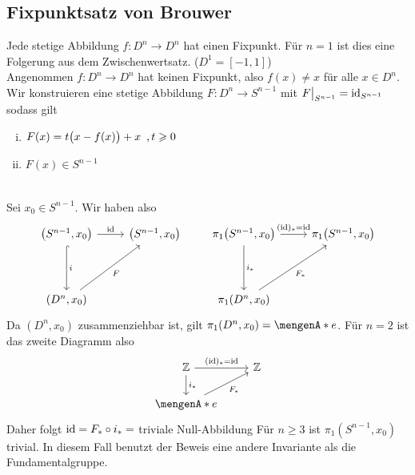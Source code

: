 \subsection{Fixpunktsatz von Brouwer} %
\label{sub:11.8}
Jede stetige Abbildung $f : D^n \to D^n$ hat einen Fixpunkt.
Für $n=1$ ist dies eine Folgerung aus dem Zwischenwertsatz. ($D^1= [-1,1]$)\smallskip \\
Angenommen $f : D^n \to D^n$ hat keinen Fixpunkt, also $f(x) \not= x$ für alle $x \in D^n$. Wir konstruieren eine stetige Abbildung $F : D^n \to S^{n-1}$ mit 
$F\big|_{S^{n-1}} = \id_{S^{n-1}}$ sodass gilt \\
\begin{minipage}{0.45\textwidth}
	\begin{enumerate}[(i)]
		\item $F(x) = t \enbrace[\big]{x- f(x)} + x \enspace, t\ge 0$
		\item $F(x) \in S^{n-1}$
	\end{enumerate}
\end{minipage} \quad 
\begin{minipage}{0.5\textwidth}
	\captionsetup{type=figure, skip=4pt, name=Abb.}
\end{minipage} \\
Sei $x_0 \in S^{n-1}$. Wir haben also
\[
	\begin{tikzcd}[row sep=4em]
		\enbrace*{S^{n-1}, x_0} \rar{\id} \dar[hook]{i} & \enbrace*{S^{n-1}, x_0} \\
		\enbrace*{D^n, x_0} \urar[swap]{F}
	\end{tikzcd}
	\qquad \begin{tikzcd}[row sep=4em]
		\pi_1 \enbrace*{S^{n-1}, x_0} \rar{(\id)_* = \id}  \dar{i_*}& \pi_1 \enbrace*{S^{n-1}, x_0} \\
		\pi_1 \enbrace*{D^n, x_0} \urar[swap]{F_*}   
	\end{tikzcd}
\]
Da $(D^n, x_0)$ zusammenziehbar ist, gilt $\pi_1 \enbrace*{D^n, x_0} = \set{e}$.
Für $n=2$ ist das zweite Diagramm also
\[
	\begin{tikzcd}
			\mathds{Z} \rar{(\id)_* = \id}  \dar{i_*}& \mathds{Z} \\
			\set{e} \urar[swap]{F_*} 
		\end{tikzcd}
\]
Daher folgt $\id = F_* \circ  i_* =$ triviale Null-Abbildung \light \bewende
{}
Für $n \ge 3$ ist $\pi_1(S^{n-1}, x_0)$ trivial. In diesem Fall benutzt der Beweis eine andere Invariante als die Fundamentalgruppe.

